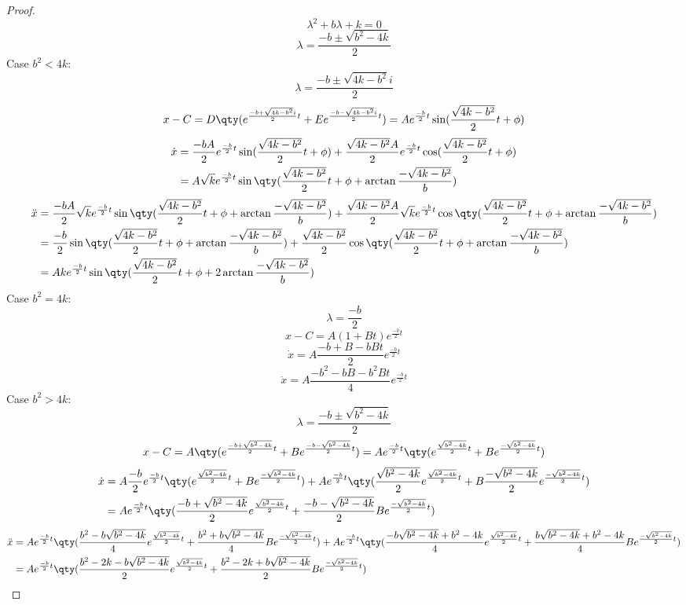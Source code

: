 \documentclass[a4paper,12pt]{article}
\begin{document}
\begin{proof}
\[\lambda^2+b\lambda+k=0\]
\[\lambda=\frac{-b\pm\sqrt{b^2-4k}}{2}\]
Case $b^2<4k$:
\[\lambda=\frac{-b\pm\sqrt{4k-b^2}i}{2}\]
\[x-C=D\qty(e^{\frac{-b+\sqrt{4k-b^2}i}{2}t}+Ee^{\frac{-b-\sqrt{4k-b^2}i}{2}t})=Ae^{\frac{-b}{2}t}\sin(\frac{\sqrt{4k-b^2}}{2}t+\phi)\]
\[\begin{aligned}
\dot{x}&=\frac{-bA}{2}e^{\frac{-b}{2}t}\sin(\frac{\sqrt{4k-b^2}}{2}t+\phi)+\frac{\sqrt{4k-b^2}A}{2}e^{\frac{-b}{2}t}\cos(\frac{\sqrt{4k-b^2}}{2}t+\phi)\\
&=A\sqrt{k}e^{\frac{-b}{2}t}\sin\qty(\frac{\sqrt{4k-b^2}}{2}t+\phi+\arctan\frac{-\sqrt{4k-b^2}}{b})
\end{aligned}\]
\[\begin{aligned}
\ddot{x}&=\frac{-bA}{2}\sqrt{k}e^{\frac{-b}{2}t}\sin\qty(\frac{\sqrt{4k-b^2}}{2}t+\phi+\arctan\frac{-\sqrt{4k-b^2}}{b})+\frac{\sqrt{4k-b^2}A}{2}\sqrt{k}e^{\frac{-b}{2}t}\cos\qty(\frac{\sqrt{4k-b^2}}{2}t+\phi+\arctan\frac{-\sqrt{4k-b^2}}{b})\\
&=\frac{-b}{2}\sin\qty(\frac{\sqrt{4k-b^2}}{2}t+\phi+\arctan\frac{-\sqrt{4k-b^2}}{b})+\frac{\sqrt{4k-b^2}}{2}\cos\qty(\frac{\sqrt{4k-b^2}}{2}t+\phi+\arctan\frac{-\sqrt{4k-b^2}}{b})\\
&=Ake^{\frac{-b}{2}t}\sin\qty(\frac{\sqrt{4k-b^2}}{2}t+\phi+2\arctan\frac{-\sqrt{4k-b^2}}{b})
\end{aligned}\]
Case $b^2=4k$:
\[\lambda=\frac{-b}{2}\]
\[x-C=A(1+Bt)e^{\frac{-b}{2}t}\]
\[\dot{x}=A\frac{-b+B-bBt}{2}e^{\frac{-b}{2}t}\]
\[\ddot{x}=A\frac{-b^2-bB-b^2Bt}{4}e^{\frac{-b}{2}t}\]
Case $b^2>4k$:
\[\lambda=\frac{-b\pm\sqrt{b^2-4k}}{2}\]
\[x-C=A\qty(e^{\frac{-b+\sqrt{b^2-4k}}{2}t}+Be^{\frac{-b-\sqrt{b^2-4k}}{2}t})=Ae^{\frac{-b}{2}t}\qty(e^{\frac{\sqrt{b^2-4k}}{2}t}+Be^{\frac{-\sqrt{b^2-4k}}{2}t})\]
\[\begin{aligned}
\dot{x}&=A\frac{-b}{2}e^{\frac{-b}{2}t}\qty(e^{\frac{\sqrt{b^2-4k}}{2}t}+Be^{\frac{-\sqrt{b^2-4k}}{2}t})+Ae^{\frac{-b}{2}t}\qty(\frac{\sqrt{b^2-4k}}{2}e^{\frac{\sqrt{b^2-4k}}{2}t}+B\frac{-\sqrt{b^2-4k}}{2}e^{\frac{-\sqrt{b^2-4k}}{2}t})\\
&=Ae^{\frac{-b}{2}t}\qty(\frac{-b+\sqrt{b^2-4k}}{2}e^{\frac{\sqrt{b^2-4k}}{2}t}+\frac{-b-\sqrt{b^2-4k}}{2}Be^{\frac{-\sqrt{b^2-4k}}{2}t})
\end{aligned}\]
\[\begin{aligned}
\ddot{x}&=Ae^{\frac{-b}{2}t}\qty(\frac{b^2-b\sqrt{b^2-4k}}{4}e^{\frac{\sqrt{b^2-4k}}{2}t}+\frac{b^2+b\sqrt{b^2-4k}}{4}Be^{\frac{-\sqrt{b^2-4k}}{2}t})+Ae^{\frac{-b}{2}t}\qty(\frac{-b\sqrt{b^2-4k}+b^2-4k}{4}e^{\frac{\sqrt{b^2-4k}}{2}t}+\frac{b\sqrt{b^2-4k}+b^2-4k}{4}Be^{\frac{-\sqrt{b^2-4k}}{2}t})\\
&=Ae^{\frac{-b}{2}t}\qty(\frac{b^2-2k-b\sqrt{b^2-4k}}{2}e^{\frac{\sqrt{b^2-4k}}{2}t}+\frac{b^2-2k+b\sqrt{b^2-4k}}{2}Be^{\frac{-\sqrt{b^2-4k}}{2}t})
\end{aligned}\]
\end{proof}
\end{document}
